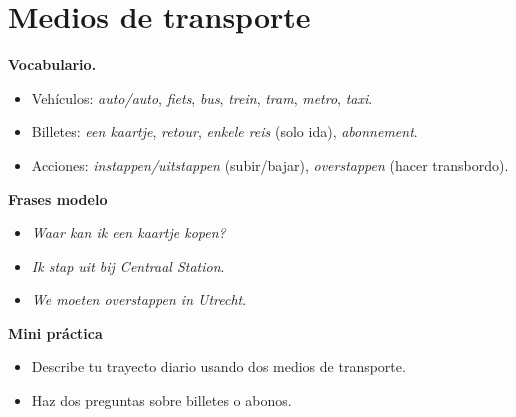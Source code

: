 \section{Medios de transporte}
\textbf{Vocabulario.}
\begin{itemize}[leftmargin=*]
  \item Vehículos: \textit{auto/auto}, \textit{fiets}, \textit{bus}, \textit{trein}, \textit{tram}, \textit{metro}, \textit{taxi}.
  \item Billetes: \textit{een kaartje}, \textit{retour}, \textit{enkele reis} (solo ida), \textit{abonnement}.
  \item Acciones: \textit{instappen/uitstappen} (subir/bajar), \textit{overstappen} (hacer transbordo).
\end{itemize}

\textbf{Frases modelo}
\begin{itemize}[leftmargin=*]
  \item \textit{Waar kan ik een kaartje kopen?}
  \item \textit{Ik stap uit bij Centraal Station}.
  \item \textit{We moeten overstappen in Utrecht}.
\end{itemize}

\textbf{Mini práctica}
\begin{itemize}[leftmargin=*]
  \item Describe tu trayecto diario usando dos medios de transporte.
  \item Haz dos preguntas sobre billetes o abonos.
\end{itemize}
